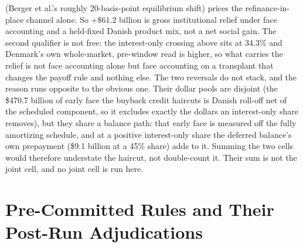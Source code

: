 \documentclass[12pt]{article}
\begin{document}
(Berger et al.'s roughly 20-basis-point equilibrium shift) prices the refinance-in-place channel alone. So $+\$61.2$ billion is gross institutional relief under face accounting and a held-fixed Danish product mix, not a net social gain. The second qualifier is not free: the interest-only crossing above sits at 34.3\% and Denmark's own whole-market, pre-window read is higher, so what carries the relief is not face accounting alone but face accounting on a transplant that changes the payoff rule and nothing else. The two reversals do not stack, and the reason runs opposite to the obvious one. Their dollar pools are disjoint (the \$470.7 billion of early face the buyback credit haircuts is Danish roll-off net of the scheduled component, so it excludes exactly the dollars an interest-only share removes), but they share a balance path: that early face is measured off the fully amortizing schedule, and at a positive interest-only share the deferred balance's own prepayment (\$9.1 billion at a 45\% share) adds to it. Summing the two cells would therefore understate the haircut, not double-count it. Their sum is not the joint cell, and no joint cell is run here.

\section{Pre-Committed Rules and Their Post-Run Adjudications}\label{app:verdicts}
\end{document}
